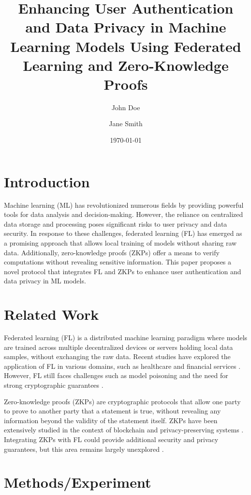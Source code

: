 \documentclass{article}
\title{Enhancing User Authentication and Data Privacy in Machine Learning Models Using Federated Learning and Zero-Knowledge Proofs}
\author{John Doe \and Jane Smith}
\date{\today}
\begin{document}
\maketitle

\section{Introduction}
\label{sec:introduction}

Machine learning (ML) has revolutionized numerous fields by providing powerful tools for data analysis and decision-making. However, the reliance on centralized data storage and processing poses significant risks to user privacy and data security. In response to these challenges, federated learning (FL) has emerged as a promising approach that allows local training of models without sharing raw data. Additionally, zero-knowledge proofs (ZKPs) offer a means to verify computations without revealing sensitive information. This paper proposes a novel protocol that integrates FL and ZKPs to enhance user authentication and data privacy in ML models.

\section{Related Work}
\label{sec:related-work}

Federated learning (FL) is a distributed machine learning paradigm where models are trained across multiple decentralized devices or servers holding local data samples, without exchanging the raw data. Recent studies have explored the application of FL in various domains, such as healthcare \cite{FL_healthcare} and financial services \cite{FL_financial}. However, FL still faces challenges such as model poisoning and the need for strong cryptographic guarantees \cite{FL_security}.

Zero-knowledge proofs (ZKPs) are cryptographic protocols that allow one party to prove to another party that a statement is true, without revealing any information beyond the validity of the statement itself. ZKPs have been extensively studied in the context of blockchain and privacy-preserving systems \cite{ZKP_blockchain, ZKP_privacy}. Integrating ZKPs with FL could provide additional security and privacy guarantees, but this area remains largely unexplored \cite{ZKP_FL}.

\section{Methods/Experiment}
\label{sec:methods}
\end{document}
